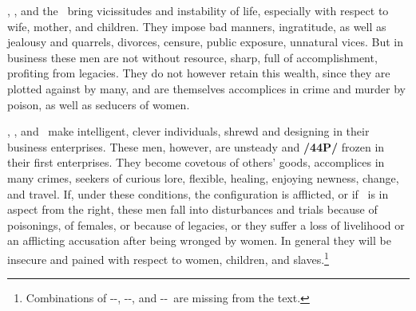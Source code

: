 \Saturn, \Venus, and the \Moon\, bring vicissitudes and instability of life, especially with respect to wife, mother, and children. They impose bad manners, ingratitude, as well as jealousy and quarrels, divorces, censure, public exposure, unnatural vices. But in business these men are not without resource, sharp, full of accomplishment, profiting from legacies. They do not however retain this wealth, since they are plotted against by many, and are themselves accomplices in crime and murder by poison, as well as seducers of women.

\Saturn, \Venus, and \Mercury\, make intelligent, clever individuals, shrewd and designing in their business enterprises. These men, however, are unsteady and \textbf{/44P/} frozen in their first enterprises. They become covetous of others’ goods, accomplices in many crimes, seekers of curious lore, flexible, healing, enjoying newness, change, and travel. If, under these conditions, the configuration is afflicted, or if \Mars\, is in aspect from the right, these men fall into disturbances and trials because of poisonings, of females, or because of legacies, or they suffer a loss of livelihood or an afflicting accusation after being wronged by women. In general they will be insecure and pained with respect to women, children, and slaves.\footnote{Combinations of \Saturn-\Mercury-\Sun, \Saturn-\Mercury-\Moon, and \Saturn-\Sun-\Moon\, are missing from the text.}

\secbr
